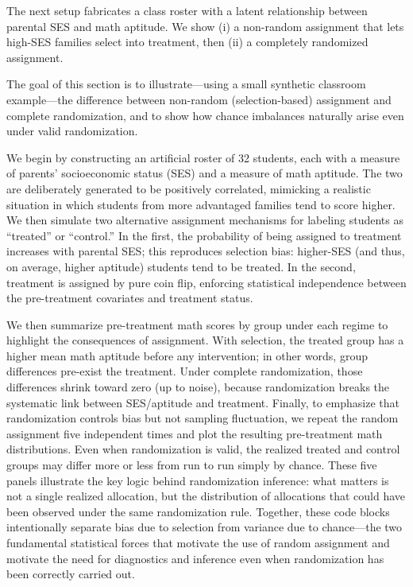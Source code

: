 \documentclass[
  letterpaper,
  DIV=11,
  numbers=noendperiod]{scrreprt}
\begin{document}
The next setup fabricates a class roster with a latent relationship
between parental SES and math aptitude. We show (i) a non-random
assignment that lets high-SES families select into treatment, then (ii)
a completely randomized assignment.

The goal of this section is to illustrate---using a small synthetic
classroom example---the difference between non-random (selection-based)
assignment and complete randomization, and to show how chance imbalances
naturally arise even under valid randomization.

We begin by constructing an artificial roster of 32 students, each with
a measure of parents' socioeconomic status (SES) and a measure of math
aptitude. The two are deliberately generated to be positively
correlated, mimicking a realistic situation in which students from more
advantaged families tend to score higher. We then simulate two
alternative assignment mechanisms for labeling students as ``treated''
or ``control.'' In the first, the probability of being assigned to
treatment increases with parental SES; this reproduces selection bias:
higher-SES (and thus, on average, higher aptitude) students tend to be
treated. In the second, treatment is assigned by pure coin flip,
enforcing statistical independence between the pre-treatment covariates
and treatment status.

We then summarize pre-treatment math scores by group under each regime
to highlight the consequences of assignment. With selection, the treated
group has a higher mean math aptitude before any intervention; in other
words, group differences pre-exist the treatment. Under complete
randomization, those differences shrink toward zero (up to noise),
because randomization breaks the systematic link between SES/aptitude
and treatment. Finally, to emphasize that randomization controls bias
but not sampling fluctuation, we repeat the random assignment five
independent times and plot the resulting pre-treatment math
distributions. Even when randomization is valid, the realized treated
and control groups may differ more or less from run to run simply by
chance. These five panels illustrate the key logic behind randomization
inference: what matters is not a single realized allocation, but the
distribution of allocations that could have been observed under the same
randomization rule. Together, these code blocks intentionally separate
bias due to selection from variance due to chance---the two fundamental
statistical forces that motivate the use of random assignment and
motivate the need for diagnostics and inference even when randomization
has been correctly carried out.
\end{document}
